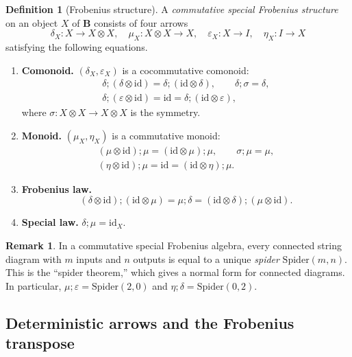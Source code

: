 \documentclass[11pt,a4paper]{article}
\theoremstyle{definition}
\newtheorem{definition}[theorem]{Definition}
\newtheorem{remark}[theorem]{Remark}
\newcommand{\id}{\mathrm{id}}
\begin{document}
\begin{definition}[Frobenius structure]\label{def:frob}
A \emph{commutative special Frobenius structure} on an object $X$ of $\mathbf{B}$ consists of four arrows
\[
  \delta_X \colon X \to X \otimes X, \quad
  \mu_X \colon X \otimes X \to X, \quad
  \varepsilon_X \colon X \to I, \quad
  \eta_X \colon I \to X
\]
satisfying the following equations.

\begin{enumerate}[label=(\alph*),leftmargin=2em]
  \item \textbf{Comonoid.} $(\delta_X, \varepsilon_X)$ is a cocommutative comonoid:
  \begin{gather*}
    \delta;(\delta \otimes \id) = \delta;(\id \otimes \delta), \qquad
    \delta;\sigma = \delta, \\
    \delta;(\varepsilon \otimes \id) = \id = \delta;(\id \otimes \varepsilon),
  \end{gather*}
  where $\sigma \colon X \otimes X \to X \otimes X$ is the symmetry.

  \item \textbf{Monoid.} $(\mu_X, \eta_X)$ is a commutative monoid:
  \begin{gather*}
    (\mu \otimes \id);\mu = (\id \otimes \mu);\mu, \qquad
    \sigma;\mu = \mu, \\
    (\eta \otimes \id);\mu = \id = (\id \otimes \eta);\mu.
  \end{gather*}

  \item \textbf{Frobenius law.}
  \[
    (\delta \otimes \id);(\id \otimes \mu) = \mu;\delta = (\id \otimes \delta);(\mu \otimes \id).
  \]

  \item \textbf{Special law.} $\delta;\mu = \id_X$.
\end{enumerate}
\end{definition}

\begin{remark}\label{rmk:spider}
In a commutative special Frobenius algebra, every connected string diagram with $m$ inputs and $n$ outputs is equal to a unique \emph{spider} $\mathrm{Spider}(m,n)$. This is the ``spider theorem,'' which gives a normal form for connected diagrams. In particular, $\mu;\varepsilon = \mathrm{Spider}(2,0)$ and $\eta;\delta = \mathrm{Spider}(0,2)$.
\end{remark}

\subsection{Deterministic arrows and the Frobenius transpose}
\end{document}
